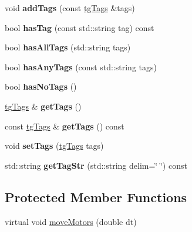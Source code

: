 \begin{DoxyCompactItemize}
\item 
\hypertarget{classtg_taggable_af28e3fe1a7e4eb28772dc006d575dd1f}{void {\bfseries add\-Tags} (const \hyperlink{classtg_tags}{tg\-Tags} \&tags)}\label{classtg_taggable_af28e3fe1a7e4eb28772dc006d575dd1f}

\item 
\hypertarget{classtg_taggable_ae31f65869c8887bfeb34a344902c4d5b}{bool {\bfseries has\-Tag} (const std\-::string tag) const }\label{classtg_taggable_ae31f65869c8887bfeb34a344902c4d5b}

\item 
\hypertarget{classtg_taggable_a33b77b1075171b63f673965687b2e844}{bool {\bfseries has\-All\-Tags} (std\-::string tags)}\label{classtg_taggable_a33b77b1075171b63f673965687b2e844}

\item 
\hypertarget{classtg_taggable_af14af28fa98021c4f20a5e8f2ddd5606}{bool {\bfseries has\-Any\-Tags} (const std\-::string tags)}\label{classtg_taggable_af14af28fa98021c4f20a5e8f2ddd5606}

\item 
\hypertarget{classtg_taggable_adff345e116e16420c701a748ff8f995f}{bool {\bfseries has\-No\-Tags} ()}\label{classtg_taggable_adff345e116e16420c701a748ff8f995f}

\item 
\hypertarget{classtg_taggable_acf1d7fa9df8f374f25015c4080902681}{\hyperlink{classtg_tags}{tg\-Tags} \& {\bfseries get\-Tags} ()}\label{classtg_taggable_acf1d7fa9df8f374f25015c4080902681}

\item 
\hypertarget{classtg_taggable_ae70d7d3b45301665bc363b0ed8b9b292}{const \hyperlink{classtg_tags}{tg\-Tags} \& {\bfseries get\-Tags} () const }\label{classtg_taggable_ae70d7d3b45301665bc363b0ed8b9b292}

\item 
\hypertarget{classtg_taggable_a5492888e4e4da4cca6261070b5726adf}{void {\bfseries set\-Tags} (\hyperlink{classtg_tags}{tg\-Tags} tags)}\label{classtg_taggable_a5492888e4e4da4cca6261070b5726adf}

\item 
\hypertarget{classtg_taggable_a346d66b066d2d9eb1eadba01da43749f}{std\-::string {\bfseries get\-Tag\-Str} (std\-::string delim=\char`\"{} \char`\"{}) const }\label{classtg_taggable_a346d66b066d2d9eb1eadba01da43749f}

\end{DoxyCompactItemize}
\subsection*{Protected Member Functions}
\begin{DoxyCompactItemize}
\item 
virtual void \hyperlink{classtg_linear_string_a4d0aaf4ae1652fbc4f14602e6b7e092d}{move\-Motors} (double dt)
\end{DoxyCompactItemize}
